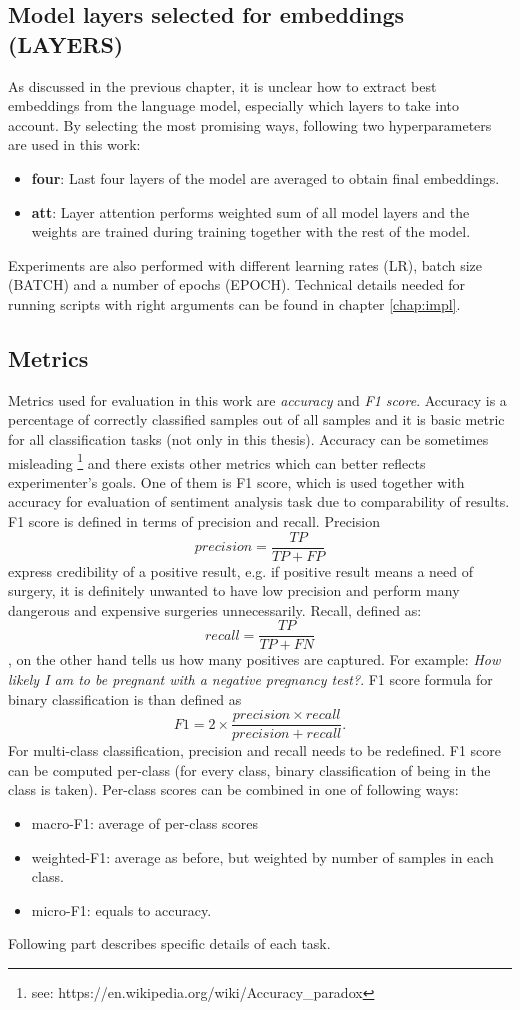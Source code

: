 \subsection{Model layers selected for embeddings (LAYERS)}
As discussed in the previous chapter, it is unclear how to extract best embeddings from the language model, especially which layers to take into account. By selecting the most promising ways, following two hyperparameters are used in this work:
\begin{itemize}
\item \textbf{four}: Last four layers of the model are averaged to obtain final embeddings.
\item \textbf{att}: Layer attention performs weighted sum of all model layers and the weights are trained during training together with the rest of the model.
\end{itemize}
Experiments are also performed with different learning rates (LR), batch size (BATCH) and a number of epochs (EPOCH). 
Technical details needed for running scripts with right arguments can be found in chapter \ref{chap:impl}.

\subsection{Metrics}
Metrics used for evaluation in this work are \textit{accuracy} and \textit{F1 score}. 
Accuracy is a percentage of correctly classified samples out of all samples and it is basic metric for all classification tasks (not only in this thesis). Accuracy can be sometimes misleading \footnote{see: https://en.wikipedia.org/wiki/Accuracy\_paradox} and there exists other metrics which can better reflects experimenter's goals. One of them is F1 score, which is used together with accuracy for evaluation of sentiment analysis task due to comparability of results. F1 score is defined in terms of precision and recall. Precision  
$$precision = \frac{TP}{TP + FP}$$ express credibility of a positive result, e.g. if positive result means  a need of surgery, it is definitely unwanted to have low precision and perform many dangerous and expensive surgeries unnecessarily. Recall, defined as: $$recall = \frac{TP}{TP + FN}$$,
on the other hand tells us how many positives are captured. For example: \textit{How likely I am to be pregnant with a negative pregnancy test?}. F1 score formula for binary classification is than defined as
$$F1 = 2 \times \frac{precision \times recall}{precision + recall}.$$
For multi-class classification, precision and recall needs to be redefined. F1 score can be computed per-class (for every class, binary classification of being in the class is taken). Per-class scores can be combined in one of following ways:
\begin{itemize}
\item macro-F1: average of per-class scores
\item weighted-F1: average as before, but weighted by number of samples in each class.
\item micro-F1: equals to accuracy.
\end{itemize}
\par
Following part describes specific details of each task.
\newpage

\newpage


